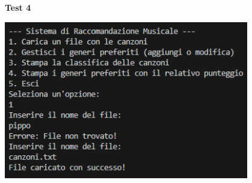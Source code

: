 \documentclass[a4paper,11pt]{article}
\begin{document}
    \begin{center}
        \textbf{Test 4}
        \par
        \vspace{0.5cm}
        \includegraphics[width=0.8\textwidth]{Immagini/Tests/htest4}
    \end{center}
\end{document}
